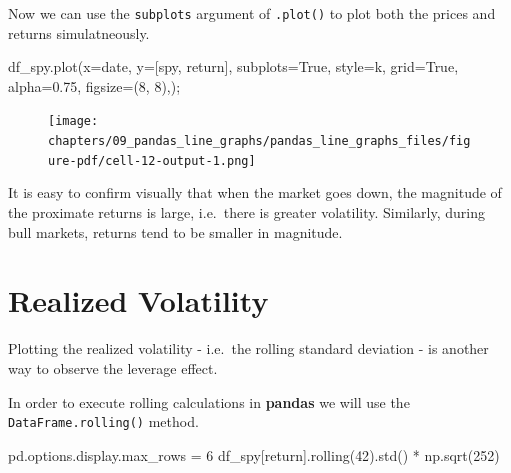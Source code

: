 \documentclass[
  letterpaper,
  DIV=11,
  numbers=noendperiod]{scrreprt}
\newenvironment{Shaded}{\begin{snugshade}}{\end{snugshade}}
\newcommand{\DecValTok}[1]{\textcolor[rgb]{0.68,0.00,0.00}{#1}}
\newcommand{\FloatTok}[1]{\textcolor[rgb]{0.68,0.00,0.00}{#1}}
\newcommand{\NormalTok}[1]{\textcolor[rgb]{0.00,0.23,0.31}{#1}}
\newcommand{\OperatorTok}[1]{\textcolor[rgb]{0.37,0.37,0.37}{#1}}
\newcommand{\StringTok}[1]{\textcolor[rgb]{0.13,0.47,0.30}{#1}}
\newcommand{\VariableTok}[1]{\textcolor[rgb]{0.07,0.07,0.07}{#1}}
\begin{document}
Now we can use the \texttt{subplots} argument of \texttt{.plot()} to
plot both the prices and returns simulatneously.

\begin{Shaded}
\begin{Highlighting}[]
\NormalTok{df\_spy.plot(x}\OperatorTok{=}\StringTok{\textquotesingle{}date\textquotesingle{}}\NormalTok{, y}\OperatorTok{=}\NormalTok{[}\StringTok{\textquotesingle{}spy\textquotesingle{}}\NormalTok{, }\StringTok{\textquotesingle{}return\textquotesingle{}}\NormalTok{], subplots}\OperatorTok{=}\VariableTok{True}\NormalTok{, style}\OperatorTok{=}\StringTok{\textquotesingle{}k\textquotesingle{}}\NormalTok{, grid}\OperatorTok{=}\VariableTok{True}\NormalTok{, alpha}\OperatorTok{=}\FloatTok{0.75}\NormalTok{, figsize}\OperatorTok{=}\NormalTok{(}\DecValTok{8}\NormalTok{, }\DecValTok{8}\NormalTok{),)}\OperatorTok{;}
\end{Highlighting}
\end{Shaded}

\begin{figure}[H]

{\centering \texttt{[image: chapters/09\_pandas\_line\_graphs/pandas\_line\_graphs\_files/figure-pdf/cell-12-output-1.png]}

}

\end{figure}

It is easy to confirm visually that when the market goes down, the
magnitude of the proximate returns is large, i.e.~there is greater
volatility. Similarly, during bull markets, returns tend to be smaller
in magnitude.

\hypertarget{realized-volatility}{%
\section{Realized Volatility}\label{realized-volatility}}

Plotting the realized volatility - i.e.~the rolling standard deviation -
is another way to observe the leverage effect.

In order to execute rolling calculations in \textbf{pandas} we will use
the \texttt{DataFrame.rolling()} method.

\begin{Shaded}
\begin{Highlighting}[]
\NormalTok{pd.options.display.max\_rows }\OperatorTok{=} \DecValTok{6}
\NormalTok{df\_spy[}\StringTok{\textquotesingle{}return\textquotesingle{}}\NormalTok{].rolling(}\DecValTok{42}\NormalTok{).std() }\OperatorTok{*}\NormalTok{ np.sqrt(}\DecValTok{252}\NormalTok{)}
\end{Highlighting}
\end{Shaded}
\end{document}
